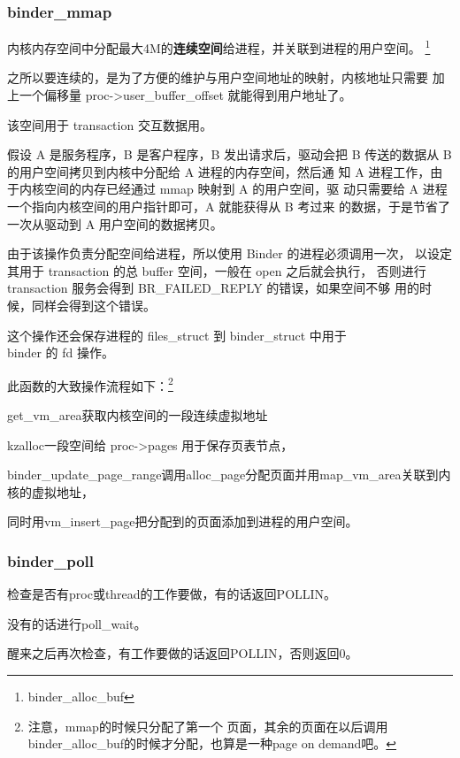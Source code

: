 \documentclass[a4paper,11pt]{article}
\begin{document}
\subsubsection{binder_mmap}\label{Bindermmap}
内核内存空间中分配最大4M的\textbf{\color{red}连续空间}给进程，并关联到进程的用户空间。
\footnote{binder_alloc_buf }
\begin{itemize*}
    \item 之所以要连续的，是为了方便的维护与用户空间地址的映射，内核地址只需要
        加上一个偏移量 proc->user_buffer_offset 就能得到用户地址了。
    \item 该空间用于 transaction 交互数据用。

        {\footnotesize 假设 A 是服务程序，B 是客户程序，B 发出请求后，驱动会把
        B 传送的数据从 B 的用户空间拷贝到内核中分配给 A 进程的内存空间，然后通
        知 A 进程工作，由于内核空间的内存已经通过 mmap 映射到 A 的用户空间，驱
        动只需要给 A 进程一个指向内核空间的用户指针即可，A 就能获得从 B 考过来
        的数据，于是节省了一次从驱动到 A 用户空间的数据拷贝。}
    \item 由于该操作负责分配空间给进程，所以使用 Binder 的进程必须调用一次，
        以设定其用于 transaction 的总 buffer 空间，一般在 open 之后就会执行，
        否则进行 transaction 服务会得到 BR_FAILED_REPLY 的错误，如果空间不够
        用的时候，同样会得到这个错误。
    \item 这个操作还会保存进程的 files_struct 到 binder_struct 中用于\\ binder
        的 fd 操作。
\end{itemize*}
此函数的大致操作流程如下：\footnote{\color{blue}注意，mmap的时候只分配了第一个
页面，其余的页面在以后调用binder_alloc_buf的时候才分配，也算是一种page on
demand吧。}
\begin{itemize*}
    \item get_vm_area获取内核空间的一段连续虚拟地址
    \item kzalloc一段空间给 proc->pages 用于保存页表节点，
    \item binder_update_page_range调用alloc_page分配页面并用map_vm_area关联到内核的虚拟地址，
    \item 同时用vm_insert_page把分配到的页面添加到进程的用户空间。
\end{itemize*}

\subsubsection{binder_poll}
\begin{itemize*}
    \item 检查是否有proc或thread的工作要做，有的话返回POLLIN。
    \item 没有的话进行poll_wait。
    \item 醒来之后再次检查，有工作要做的话返回POLLIN，否则返回0。
\end{itemize*}
\end{document}
